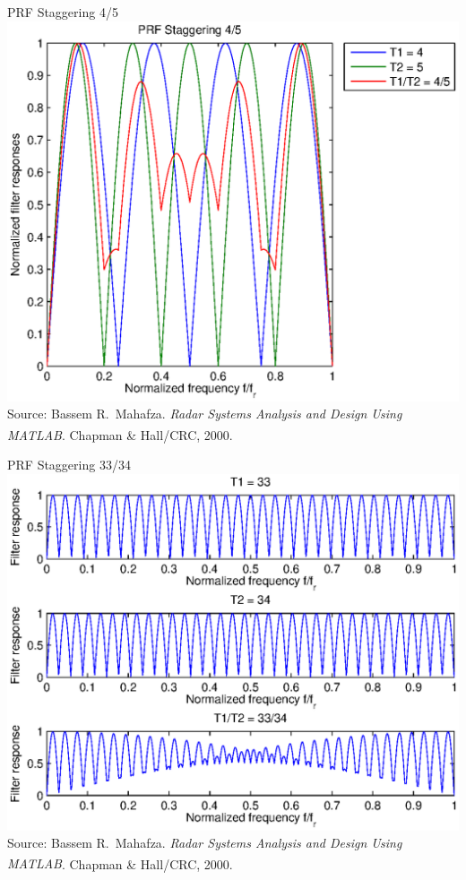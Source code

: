 \documentclass[mathserif]{beamer}
\begin{document}
    
    \begin{frame}{PRF Staggering 4/5}
	\includegraphics[width=\linewidth]{prfStaggering4_5} \\
	\tiny{Source: Bassem R.~Mahafza. \emph{Radar Systems Analysis and Design Using MATLAB\textsuperscript{\textregistered}}. Chapman \& Hall/CRC, 2000.}
    \end{frame}
    
    
    \begin{frame}{PRF Staggering 33/34}
    \includegraphics[width=\linewidth]{prfStaggering33_34} \\
      \tiny{Source: Bassem R.~Mahafza. \emph{Radar Systems Analysis and Design Using MATLAB\textsuperscript{\textregistered}}. Chapman \& Hall/CRC, 2000.}
    \end{frame}
    
\end{document}
